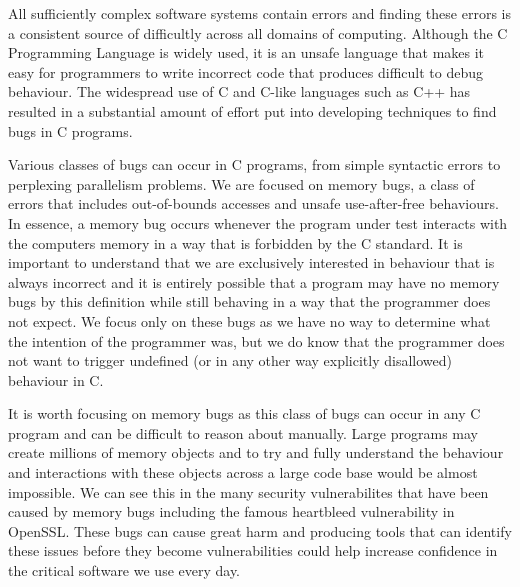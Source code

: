 \documentclass[12pt,twoside]{report}
\begin{document}

All sufficiently complex software systems contain errors and finding these errors is a consistent source of difficultly across all domains of computing. Although the C Programming Language is widely used, it is an unsafe language that makes it easy for programmers to write incorrect code that produces difficult to debug behaviour. The widespread use of C and C-like languages such as C++ has resulted in a substantial amount of effort put into developing techniques to find bugs in C programs.


Various classes of bugs can occur in C programs, from simple syntactic errors to perplexing parallelism problems. We are focused on memory bugs, a class of errors that includes out-of-bounds accesses and unsafe use-after-free behaviours. In essence, a memory bug occurs whenever the program under test interacts with the computers memory in a way that is forbidden by the C standard. It is important to understand that we are exclusively interested in behaviour that is always incorrect and it is entirely possible that a program may have no memory bugs by this definition while still behaving in a way that the programmer does not expect. We focus only on these bugs as we have no way to determine what the intention of the programmer was, but we do know that the programmer does not want to trigger undefined (or in any other way explicitly disallowed) behaviour in C.

It is worth focusing on memory bugs as this class of bugs can occur in any C program and can be difficult to reason about manually. Large programs may create millions of memory objects and to try and fully understand the behaviour and interactions with these objects across a large code base would be almost impossible. We can see this in the many security vulnerabilites that have been caused by memory bugs including the famous heartbleed\cite{CVE-2014-0160} vulnerability in OpenSSL. These bugs can cause great harm and producing tools that can identify these issues before they become vulnerabilities could help increase confidence in the critical software we use every day.
\end{document}
